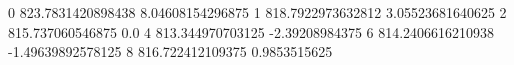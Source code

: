 0 823.7831420898438 8.04608154296875
1 818.7922973632812 3.05523681640625
2 815.737060546875 0.0
4 813.344970703125 -2.39208984375
6 814.2406616210938 -1.49639892578125
8 816.722412109375 0.9853515625
